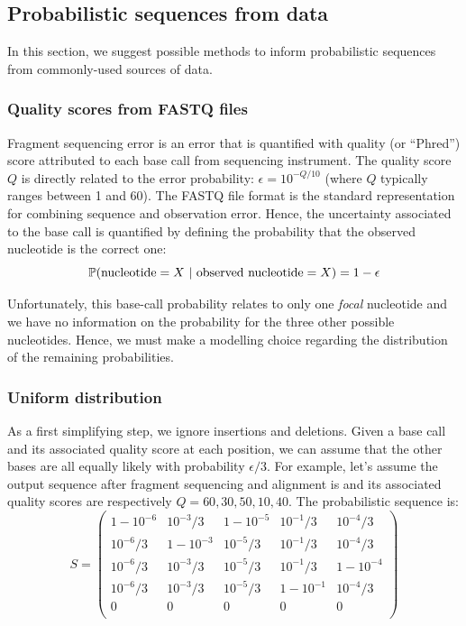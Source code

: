\documentclass[10pt]{article}
\begin{document}
\subsection{Probabilistic sequences from data}



In this section, we suggest possible methods to inform probabilistic sequences from commonly-used sources of data. 


\subsubsection{Quality scores from FASTQ files}
Fragment sequencing error is an error that is quantified with quality (or ``Phred'') score attributed to each base call from sequencing instrument. 
The quality score $Q$ is directly related to the error probability: $\epsilon = 10^{-Q/10}$ \cite{xxx} (where $Q$ typically ranges between 1 and 60). The FASTQ file format is the standard representation for combining sequence and observation error.
Hence, the uncertainty associated to the base call is quantified by defining the probability that the observed nucleotide is the correct one: 
\begin{equation}
\label{eq:basecall}
\mathbb{P}(\text{nucleotide}=X \,\,|\,\, \text{observed nucleotide} = X) = 1 - \epsilon
\end{equation}

Unfortunately, this base-call probability relates to only one \emph{focal} nucleotide and we have no information on the probability for the three other possible nucleotides. 
Hence, we must make a modelling choice regarding the distribution of the remaining probabilities. 

\subsubsection*{Uniform distribution} 
As a first simplifying step, we ignore insertions and deletions. 
Given a base call and its associated quality score at each position, we can assume that the other bases  are all equally likely with probability $\epsilon/3$. 
For example, let's assume the output sequence after fragment sequencing and alignment is  and its associated quality scores are respectively $Q=60,30,50,10,40$. The probabilistic sequence is:
\begin{equation}
S = 
\begin{pmatrix}
1-10^{-6} & 10^{-3}/3  & 1-10^{-5} & 10^{-1}/3 & 10^{-4}/3  \\
10^{-6}/3 & 1-10^{-3}  & 10^{-5}/3 & 10^{-1}/3 & 10^{-4}/3  \\
10^{-6}/3 & 10^{-3}/3  & 10^{-5}/3 & 10^{-1}/3 & 1-10^{-4} \\
10^{-6}/3 & 10^{-3}/3  & 10^{-5}/3 & 1-10^{-1} & 10^{-4}/3\\
0&0&0&0&0 \\
\end{pmatrix}
\end{equation}
\end{document}
